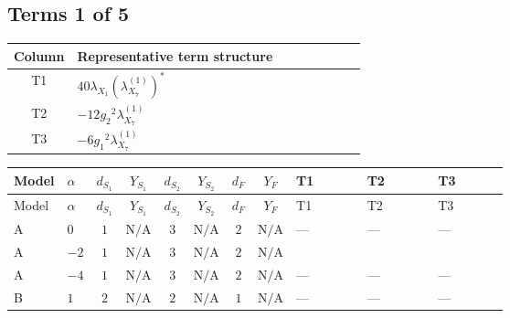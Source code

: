 \documentclass[8pt]{article}
\begin{document}
\begin{landscape}
\subsection*{Terms 1 of 5}
\begin{center}
\begin{tabular}{@{}c >{\raggedright\arraybackslash}p{0.82\linewidth}@{}}
\toprule
Column & Representative term structure \\
\midrule
T1 & \(\displaystyle 40 {\lambda_{X_{1}}} \left({\lambda_{X_{7}}^{(1)}}\right)^{*}\) \\
\midrule
T2 & \(\displaystyle -12 {g_2}^2 {\lambda_{X_{7}}^{(1)}}\) \\
\midrule
T3 & \(\displaystyle -6 {g_1}^2 {\lambda_{X_{7}}^{(1)}}\) \\
\midrule
\bottomrule
\end{tabular}
\end{center}
\smallskip
\tiny
\begin{longtable}{@{}llcccccc >{\raggedright\arraybackslash}p{0.21\linewidth} >{\raggedright\arraybackslash}p{0.21\linewidth} >{\raggedright\arraybackslash}p{0.21\linewidth}@{}}
\toprule
Model & $\alpha$ & $d_{S_1}$ & $Y_{S_1}$ & $d_{S_2}$ & $Y_{S_2}$ & $d_F$ & $Y_F$ & T1 & T2 & T3 \\
\midrule
\endfirsthead
\toprule
Model & $\alpha$ & $d_{S_1}$ & $Y_{S_1}$ & $d_{S_2}$ & $Y_{S_2}$ & $d_F$ & $Y_F$ & T1 & T2 & T3 \\
\midrule
\endhead
A & $0$ & $1$ & $\text{N/A}$ & $3$ & $\text{N/A}$ & $2$ & $\text{N/A}$ & --- & --- & --- \\
\midrule
A & $-2$ & $1$ & $\text{N/A}$ & $3$ & $\text{N/A}$ & $2$ & $\text{N/A}$ & \scriptsize\adjustbox{max width=\linewidth}{$\begin{gathered} 40 {\lambda_{X_{1}}} \left({\lambda_{X_{7}}^{(1)}}\right)^{*}\end{gathered}$} & \scriptsize\adjustbox{max width=\linewidth}{$\begin{gathered} -12 {g_2}^2 {\lambda_{X_{7}}^{(1)}}\end{gathered}$} & \scriptsize\adjustbox{max width=\linewidth}{$\begin{gathered} -6 {g_1}^2 {\lambda_{X_{7}}^{(1)}}\end{gathered}$} \\
\midrule
A & $-4$ & $1$ & $\text{N/A}$ & $3$ & $\text{N/A}$ & $2$ & $\text{N/A}$ & --- & --- & --- \\
\midrule
B & $1$ & $2$ & $\text{N/A}$ & $2$ & $\text{N/A}$ & $1$ & $\text{N/A}$ & --- & --- & --- \\

\end{longtable}
\end{landscape}
\end{document}
